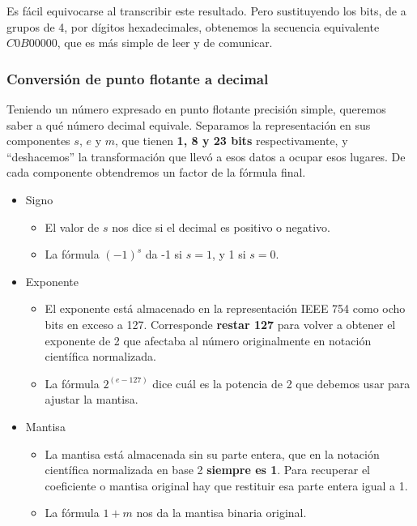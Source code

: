 \documentclass[spanish,a4paper,]{article}
\providecommand{\tightlist}{%
  \setlength{\itemsep}{0pt}\setlength{\parskip}{0pt}}
\begin{document}
Es fácil equivocarse al transcribir este resultado. Pero sustituyendo
los bits, de a grupos de 4, por dígitos hexadecimales, obtenemos la
secuencia equivalente \(C0B00000\), que es más simple de leer y de
comunicar.

\hypertarget{conversiuxf3n-de-punto-flotante-a-decimal}{%
\subsubsection{Conversión de punto flotante a
decimal}\label{conversiuxf3n-de-punto-flotante-a-decimal}}

Teniendo un número expresado en punto flotante precisión simple,
queremos saber a qué número decimal equivale. Separamos la
representación en sus componentes \(s\), \(e\) y \(m\), que tienen
\textbf{1, 8 y 23 bits} respectivamente, y ``deshacemos'' la
transformación que llevó a esos datos a ocupar esos lugares. De cada
componente obtendremos un factor de la fórmula final.

\begin{itemize}
\tightlist
\item
  Signo

  \begin{itemize}
  \tightlist
  \item
    El valor de \(s\) nos dice si el decimal es positivo o negativo.
  \item
    La fórmula \((-1)^s\) da -1 si \(s=1\), y 1 si \(s=0\).
  \end{itemize}
\item
  Exponente

  \begin{itemize}
  \tightlist
  \item
    El exponente está almacenado en la representación IEEE 754 como ocho
    bits en exceso a 127. Corresponde \textbf{restar 127} para volver a
    obtener el exponente de 2 que afectaba al número originalmente en
    notación científica normalizada.
  \item
    La fórmula \(2^{(e - 127)}\) dice cuál es la potencia de 2 que
    debemos usar para ajustar la mantisa.
  \end{itemize}
\item
  Mantisa

  \begin{itemize}
  \tightlist
  \item
    La mantisa está almacenada sin su parte entera, que en la notación
    científica normalizada en base 2 \textbf{siempre es 1}. Para
    recuperar el coeficiente o mantisa original hay que restituir esa
    parte entera igual a 1.
  \item
    La fórmula \(1 + m\) nos da la mantisa binaria original.
  \end{itemize}
\end{itemize}
\end{document}
